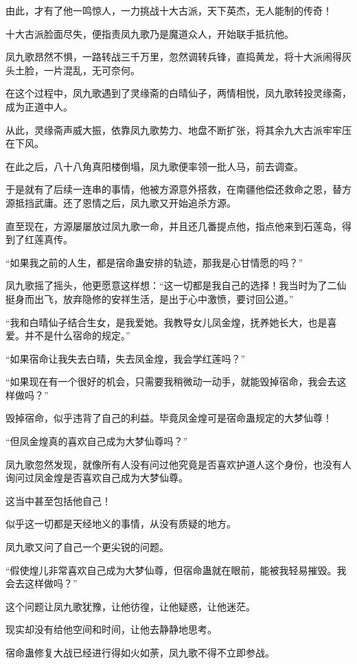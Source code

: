 \begin{this_body}
由此，才有了他一鸣惊人，一力挑战十大古派，天下英杰，无人能制的传奇！

十大古派脸面尽失，便指责凤九歌乃是魔道众人，开始联手抵抗他。

凤九歌昂然不惧，一路转战三千万里，忽然调转兵锋，直捣黄龙，将十大派闹得灰头土脸，一片混乱，无可奈何。

在这个过程中，凤九歌遇到了灵缘斋的白晴仙子，两情相悦，凤九歌转投灵缘斋，成为正道中人。

从此，灵缘斋声威大振，依靠凤九歌势力、地盘不断扩张，将其余九大古派牢牢压在下风。

在此之后，八十八角真阳楼倒塌，凤九歌便率领一批人马，前去调查。

于是就有了后续一连串的事情，他被方源意外搭救，在南疆他偿还救命之恩，替方源抵挡武庸。还了恩情之后，凤九歌又开始追杀方源。

直至现在，方源屡屡放过凤九歌一命，并且还几番提点他，指点他来到石莲岛，得到了红莲真传。

“如果我之前的人生，都是宿命蛊安排的轨迹，那我是心甘情愿的吗？”

凤九歌摇了摇头，他更愿意这样想：“这一切都是我自己的选择！我当时为了二仙挺身而出飞，放弃隐修的安祥生活，是出于心中激愤，要讨回公道。”

“我和白晴仙子结合生女，是我爱她。我教导女儿凤金煌，抚养她长大，也是喜爱。并不是什么宿命的规定。”

“如果宿命让我失去白晴，失去凤金煌，我会学红莲吗？”

“如果现在有一个很好的机会，只需要我稍微动一动手，就能毁掉宿命，我会去这样做吗？”

毁掉宿命，似乎违背了自己的利益。毕竟凤金煌可是宿命蛊规定的大梦仙尊！

“但凤金煌真的喜欢自己成为大梦仙尊吗？”

凤九歌忽然发现，就像所有人没有问过他究竟是否喜欢护道人这个身份，也没有人询问过凤金煌是否喜欢自己成为大梦仙尊。

这当中甚至包括他自己！

似乎这一切都是天经地义的事情，从没有质疑的地方。

凤九歌又问了自己一个更尖锐的问题。

“假使煌儿非常喜欢自己成为大梦仙尊，但宿命蛊就在眼前，能被我轻易摧毁。我会去这样做吗？”

这个问题让凤九歌犹豫，让他彷徨，让他疑惑，让他迷茫。

现实却没有给他空间和时间，让他去静静地思考。

宿命蛊修复大战已经进行得如火如荼，凤九歌不得不立即参战。


\end{this_body}
